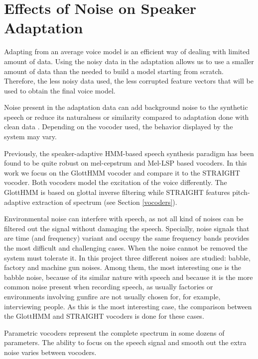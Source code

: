 \section{Effects of Noise on Speaker Adaptation}
\label{noise_speaker_adaptation}
Adapting from an average voice model is an efficient way of dealing with limited amount of data.
%
Using the noisy data in the adaptation allows us to use a smaller amount of data than the needed to build a model starting from scratch.
%
Therefore, the less noisy data used, the less corrupted feature vectors that will be used to obtain the final voice model.

Noise present in the adaptation data can add background noise to the synthetic speech or reduce its naturalness or similarity compared to adaptation done with clean data \cite{karhila_jstsp_14}.
%
Depending on the vocoder used, the behavior displayed by the system may vary.

Previously, the speaker-adaptive HMM-based speech synthesis paradigm has been found to be quite robust on mel-cepstrum \cite{karhila_jstsp_14, yamagishi2008robustness} and Mel-LSP \cite{Yanagisawa_SSW8} based vocoders.
%
In this work we focus on the GlottHMM vocoder and compare it to the STRAIGHT vocoder.
%
Both vocoders model the excitation of the voice differently.
%
The GlottHMM is based on glottal inverse filtering while STRAIGHT features pitch-adaptive extraction of spectrum (see Section \ref{vocoders}).

Environmental noise can interfere with speech, as not all kind of noises can be filtered out the signal without damaging the speech.
%
Specially, noise signals that are time (and frequency) variant and occupy the same frequency bands provides the most difficult and challenging cases.
%
When the noise cannot be removed the system must tolerate it.
%
In this project three different noises are studied: babble, factory and machine gun noises.
%
Among them, the most interesting one is the babble noise, because of its similar nature with speech and because it is the more common noise present when recording speech, as usually factories or environments involving gunfire are not usually chosen for, for example, interviewing people.
%
As this is the most interesting case, the comparison between the GlottHMM and STRAIGHT vocoders is done for these cases.

Parametric vocoders represent the complete spectrum in some dozens of parameters.
%
The ability to focus on the speech signal and smooth out the extra noise varies between vocoders.


